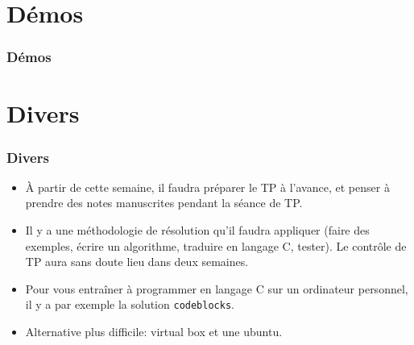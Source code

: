 \documentclass[xcolor=svgnames]{beamer}
\begin{document}
\section[Plan]{}
\frame[label=plan]{\tableofcontents%
}

\section{Démos}
\begin{frame}
  \frametitle{Démos}
\end{frame}


\section{Divers}
\begin{frame}
  \frametitle{Divers\nowrite}
  \begin{itemize}
  \item À partir de cette semaine, il faudra préparer le TP à
    l'avance, et penser à prendre des notes manuscrites pendant la
    séance de TP.\pause

   \item Il y a une méthodologie de résolution qu'il faudra appliquer
     (faire des exemples, écrire un algorithme, traduire en langage C,
     tester).  Le contrôle de TP aura sans doute lieu dans deux semaines.\pause

    \item Pour vous entraîner à programmer en langage C sur un
      ordinateur personnel, il y a par exemple la solution
      \texttt{codeblocks}. \pause

\item Alternative plus difficile: virtual box et une ubuntu.
  \end{itemize}
\end{frame}
\end{document}
